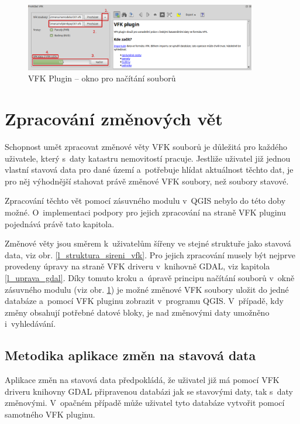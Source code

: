 \documentclass[a4paper,12pt,oneside]{book}
\begin{document}
\begin{figure}[htb]
\centering
\includegraphics[width=0.9\textwidth]{images/vfkPlugin-novy_vzhled.png}
\caption[VFK Plugin -- okno pro načítání souborů]{VFK Plugin -- okno pro načítání souborů}
\label{l_plugin_novy_vzhled}
\end{figure}


\newpage
\section{Zpracování změnových vět}
\label{l_zpracovani_zmen}
Schopnost umět zpracovat změnové věty VFK souborů je důležitá pro
každého uživatele, který s~daty katastru nemovitostí pracuje. Jestliže
uživatel již jednou vlastní stavová data pro dané území a~potřebuje
hlídat aktuálnost těchto dat, je pro něj výhodnější stahovat právě
změnové VFK soubory, než soubory stavové.

Zpracování těchto vět pomocí zásuvného modulu v~QGIS nebylo do této
doby možné. O~implementaci podpory pro jejich zpracování na straně VFK
pluginu pojednává právě tato kapitola.

Změnové věty jsou směrem k~uživatelům šířeny ve stejné struktuře jako
stavová data, viz obr. \ref{l_struktura_sireni_vfk}. Pro jejich
zpracování musely být nejprve provedeny úpravy na straně VFK driveru
v~knihovně GDAL, viz kapitola \ref{l_uprava_gdal}. Díky tomuto kroku
a~úpravě principu načítání souborů v~okně zásuvného modulu (viz
obr. \ref{l_plugin_novy_vzhled}) je možné změnové VFK soubory uložit
do jedné databáze a~pomocí VFK pluginu zobrazit v~programu
QGIS. V~případě, kdy změny obsahují potřebné datové bloky, je nad
změnovými daty umožněno i~vyhledávání.

\subsection{Metodika aplikace změn na stavová data}
Aplikace změn na stavová data předpokládá, že uživatel již má pomocí
VFK driveru knihovny GDAL připravenou databázi jak se stavovými daty,
tak s~daty změnovými. V~opačném případě může uživatel tyto databáze
vytvořit pomocí samotného VFK pluginu.
\end{document}

